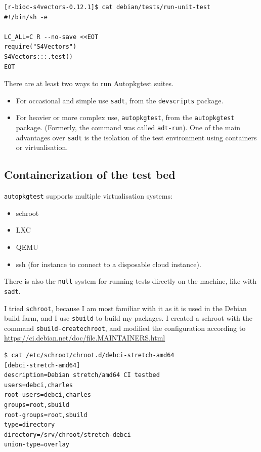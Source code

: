 \documentclass[mingoth,a4paper]{jsarticle}
\providecommand{\tightlist}{%
  \setlength{\itemsep}{0pt}\setlength{\parskip}{0pt}}
\begin{document}
{{\begin{verbatim}
[r-bioc-s4vectors-0.12.1]$ cat debian/tests/run-unit-test 
#!/bin/sh -e

LC_ALL=C R --no-save <<EOT
require("S4Vectors")
S4Vectors:::.test()
EOT
\end{verbatim}

There are at least two ways to run Autopkgtest suites.

\begin{itemize}
\item
  For occasional and simple use \texttt{sadt}, from the
  \texttt{devscripts} package.
\item
  For heavier or more complex use, \texttt{autopkgtest}, from the
  \texttt{autopkgtest} package. (Formerly, the command was called
  \texttt{adt-run}). One of the main advantages over \texttt{sadt} is
  the isolation of the test environment using containers or
  virtualisation.
\end{itemize}

\subsection{Containerization of the test
bed}\label{containerization-of-the-test-bed}

\texttt{autopkgtest} supports multiple virtualisation systems:

\begin{itemize}
\tightlist
\item
  schroot
\item
  LXC
\item
  QEMU
\item
  ssh (for instance to connect to a disposable cloud instance).
\end{itemize}

There is also the \texttt{null} system for running tests directly on the
machine, like with \texttt{sadt}.

I tried \texttt{schroot}, because I am most familiar with it as it is
used in the Debian build farm, and I use \texttt{sbuild} to build my
packages. I created a schroot with the command
\texttt{sbuild-createchroot}, and modified the configuration according
to \url{https://ci.debian.net/doc/file.MAINTAINERS.html}

\begin{verbatim}
$ cat /etc/schroot/chroot.d/debci-stretch-amd64 
[debci-stretch-amd64]
description=Debian stretch/amd64 CI testbed
users=debci,charles
root-users=debci,charles
groups=root,sbuild
root-groups=root,sbuild
type=directory
directory=/srv/chroot/stretch-debci
union-type=overlay
\end{verbatim}

}}
\end{document}
